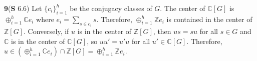 \documentclass[a4paper, 12pt]{article}
\theoremstyle{Mydefinition}
\theoremstyle{Mytheorem}
\begin{document}
\noindent \textbf{9}(\textbf{S} 6.6)
Let $\{c_i\}_{i=1}^h$ be the conjugacy classes of $G$. The center of $\mathbb{C}[G]$ is $\oplus_{i=1}^h \mathbb{C}e_i$ where $e_i = \sum_{s\in c_i}s$. Therefore, $\oplus_{i=1}^h \mathbb{Z}e_i$ is contained in the center of $\mathbb{Z}[G]$. Conversely, if $u$ is in the center of $\mathbb{Z}[G]$, then $us = su$ for all $s\in G$ and $\mathbb{C}$ is in the center of $\mathbb{C}[G]$, so $uu' = u'u$ for all $u'\in \mathbb{C}[G]$. Therefore, $u\in \left(\oplus_{i=1}^h \mathbb{C}e_i\right)\cap \mathbb{Z}[G] = \oplus_{i=1}^h \mathbb{Z}e_i$.
\end{document}
